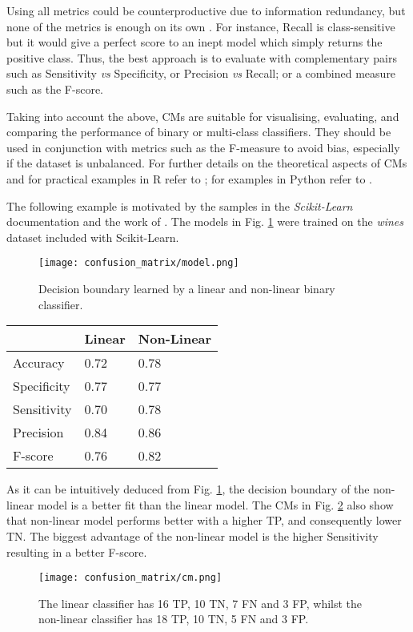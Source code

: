 Using all metrics could be counterproductive due to information redundancy, but none of the metrics is enough on its own \citep{ma2007adequate}. For instance, Recall is class-sensitive but it would give a perfect score to an inept model which simply returns the positive class. Thus, the best approach is to evaluate with complementary pairs \citep{gu2009evaluation} such as Sensitivity \textit{vs} Specificity, or Precision \textit{vs} Recall; or a combined measure such as the F-score.

Taking into account the above, CMs are suitable for visualising, evaluating, and comparing the performance of binary or multi-class classifiers. They should be used in conjunction with metrics such as the F-measure to avoid bias, especially if the dataset is unbalanced. For further details on the theoretical aspects of CMs and for practical examples in R refer to \citep{cichosz2014data}; for examples in Python refer to \citep{muller2016introduction}.

The following example is motivated by the samples in the \textit{Scikit-Learn} documentation and the work of  \citep{geron2017hands}. The models in Fig. \ref{fig:cm_model} were trained on the \textit{wines} dataset included with Scikit-Learn.

\begin{figure}
  \texttt{[image: confusion\_matrix/model.png]}
  \caption{Decision boundary learned by a linear and non-linear binary classifier.}
  \label{fig:cm_model}
\end{figure}

\begin{margintable}
  \begin{tabular}{lll}
    \toprule
                 & Linear & Non-Linear \\
    \midrule
    Accuracy     & 0.72   & 0.78 \\
    Specificity  & 0.77   & 0.77 \\
    Sensitivity  & 0.70   & 0.78 \\
    Precision    & 0.84   & 0.86 \\
    F-score      & 0.76   & 0.82 \\
    \bottomrule
  \end{tabular}
  \caption{Statistics derived from the CMs in Fig. \ref{fig:cm_wines}.}
  \label{tab:cm_metrics}
\end{margintable}

As it can be intuitively deduced from Fig. \ref{fig:cm_model}, the decision boundary of the non-linear model is a better fit than the linear model. The CMs in Fig. \ref{fig:cm_wines} also show that non-linear model performs better with a higher TP, and consequently lower TN. The biggest advantage of the non-linear model is the higher Sensitivity resulting in a better F-score.

\begin{figure}
  \texttt{[image: confusion\_matrix/cm.png]}
  \caption{The linear classifier has 16 TP, 10 TN, 7 FN and 3 FP, whilst the non-linear classifier has 18 TP, 10 TN, 5 FN and 3 FP.}
  \label{fig:cm_wines}
\end{figure}

